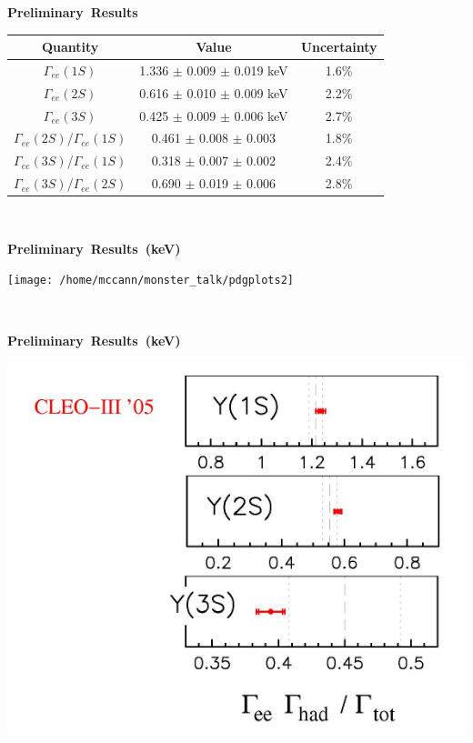 \documentclass[landscape]{article}
\newenvironment{slide}[1][ ]{\mbox{\bf #1 } \vfill}{\vfill \mbox{ } \pagebreak}
\begin{document}
\begin{slide}[Preliminary Results]

\begin{center}
  \renewcommand{\arraystretch}{2}
  \begin{tabular}{c c c}
    Quantity & Value & \mbox{\hspace{0.5 cm}} Uncertainty \mbox{\hspace{0.5 cm}} \\ \hline
    $\Gamma_{ee}(1S)$ & \mbox{\hspace{0.5 cm}} 1.336 $\pm$ 0.009 $\pm$ 0.019 keV \mbox{\hspace{0.5 cm}} & {\color{red} 1.6\%} \\
    $\Gamma_{ee}(2S)$ & 0.616 $\pm$ 0.010 $\pm$ 0.009 keV & {\color{red} 2.2\%} \\
    $\Gamma_{ee}(3S)$ & 0.425 $\pm$ 0.009 $\pm$ 0.006 keV & {\color{red} 2.7\%} \\ \hline
    $\Gamma_{ee}(2S)$/$\Gamma_{ee}(1S)$ & 0.461 $\pm$ 0.008 $\pm$ 0.003 & {\color{red} 1.8\%} \\
    $\Gamma_{ee}(3S)$/$\Gamma_{ee}(1S)$ & 0.318 $\pm$ 0.007 $\pm$ 0.002 & {\color{red} 2.4\%} \\
    $\Gamma_{ee}(3S)$/$\Gamma_{ee}(2S)$ & 0.690 $\pm$ 0.019 $\pm$ 0.006 & {\color{red} 2.8\%} \\
  \end{tabular}
\end{center}

\end{slide}

\begin{slide}[Preliminary Results (keV)]

\begin{center}
  \vspace{1.5 cm}
  \texttt{[image: /home/mccann/monster\_talk/pdgplots2]}
\end{center}

\end{slide}

\begin{slide}[Preliminary Results (keV)]

\begin{center}
  \includegraphics[width=0.8\linewidth]{prettied-zoomed_pdgplots2}
\end{center}

\end{slide}
\end{document}
